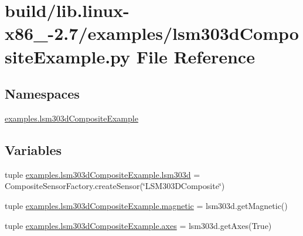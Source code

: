 \hypertarget{build_2lib_8linux-x86__64-2_87_2examples_2lsm303dCompositeExample_8py}{}\section{build/lib.linux-\/x86\+\_-\/2.7/examples/lsm303d\+Composite\+Example.py File Reference}
\label{build_2lib_8linux-x86__64-2_87_2examples_2lsm303dCompositeExample_8py}
\subsection*{Namespaces}
\begin{DoxyCompactItemize}
\item 
 \hyperlink{namespaceexamples_1_1lsm303dCompositeExample}{examples.\+lsm303d\+Composite\+Example}
\end{DoxyCompactItemize}
\subsection*{Variables}
\begin{DoxyCompactItemize}
\item 
tuple \hyperlink{namespaceexamples_1_1lsm303dCompositeExample_ad02f156b63785510a1bfe08ad8ce3e12}{examples.\+lsm303d\+Composite\+Example.\+lsm303d} = Composite\+Sensor\+Factory.\+create\+Sensor(\char`\"{}L\+S\+M303\+D\+Composite\char`\"{})
\item 
tuple \hyperlink{namespaceexamples_1_1lsm303dCompositeExample_a307ea9829e8bd013e8071040bd91772e}{examples.\+lsm303d\+Composite\+Example.\+magnetic} = lsm303d.\+get\+Magnetic()
\item 
tuple \hyperlink{namespaceexamples_1_1lsm303dCompositeExample_a3fb6d4c45ee08c132671c8376e9c2cb7}{examples.\+lsm303d\+Composite\+Example.\+axes} = lsm303d.\+get\+Axes(True)
\end{DoxyCompactItemize}
